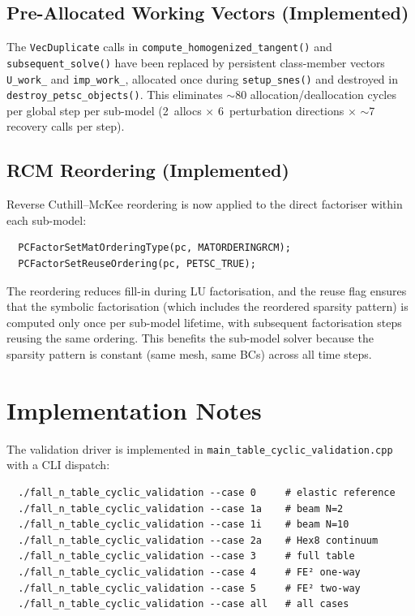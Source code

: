 \subsection{Pre-Allocated Working Vectors (Implemented)}

The \texttt{VecDuplicate} calls in
\texttt{compute\_homogenized\_tangent()} and
\texttt{subsequent\_solve()} have been replaced by persistent
class-member vectors \texttt{U\_work\_} and \texttt{imp\_work\_},
allocated once during \texttt{setup\_snes()} and destroyed in
\texttt{destroy\_petsc\_objects()}.  This eliminates $\sim 80$
allocation/deallocation cycles per global step per sub-model
(2~allocs $\times$ 6~perturbation directions $\times$ $\sim$7
recovery calls per step).

\subsection{RCM Reordering (Implemented)}

Reverse Cuthill--McKee reordering is now applied to the direct
factoriser within each sub-model:
\begin{verbatim}
  PCFactorSetMatOrderingType(pc, MATORDERINGRCM);
  PCFactorSetReuseOrdering(pc, PETSC_TRUE);
\end{verbatim}
The reordering reduces fill-in during LU factorisation, and the
reuse flag ensures that the symbolic factorisation (which includes
the reordered sparsity pattern) is computed only once per sub-model
lifetime, with subsequent factorisation steps reusing the same
ordering.  This benefits the sub-model solver because the sparsity
pattern is constant (same mesh, same BCs) across all time steps.


\section{Implementation Notes}
\label{sec:cyclic-implementation}

The validation driver is implemented in
\texttt{main\_table\_cyclic\_validation.cpp} with a CLI dispatch:

\begin{verbatim}
  ./fall_n_table_cyclic_validation --case 0     # elastic reference
  ./fall_n_table_cyclic_validation --case 1a    # beam N=2
  ./fall_n_table_cyclic_validation --case 1i    # beam N=10
  ./fall_n_table_cyclic_validation --case 2a    # Hex8 continuum
  ./fall_n_table_cyclic_validation --case 3     # full table
  ./fall_n_table_cyclic_validation --case 4     # FE² one-way
  ./fall_n_table_cyclic_validation --case 5     # FE² two-way
  ./fall_n_table_cyclic_validation --case all   # all cases
\end{verbatim}

